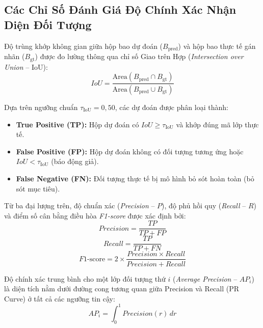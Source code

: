 \documentclass[12pt,a4paper]{article}
\begin{document}
\subsection{Các Chỉ Số Đánh Giá Độ Chính Xác Nhận Diện Đối Tượng}
Độ trùng khớp không gian giữa hộp bao dự đoán ($B_{\text{pred}}$) và hộp bao thực tế gán nhãn ($B_{\text{gt}}$) được đo lường thông qua chỉ số Giao trên Hợp (\textit{Intersection over Union} -- IoU):
\begin{equation}
\label{eq:iou_metric}
IoU = \frac{\text{Area}(B_{\text{pred}} \cap B_{\text{gt}})}{\text{Area}(B_{\text{pred}} \cup B_{\text{gt}})}
\end{equation}

Dựa trên ngưỡng chuẩn $\tau_{\text{IoU}} = 0,50$, các dự đoán được phân loại thành:
\begin{itemize}
    \item \textbf{True Positive (TP):} Hộp dự đoán có $IoU \ge \tau_{\text{IoU}}$ và khớp đúng mã lớp thực tế.
    \item \textbf{False Positive (FP):} Hộp dự đoán không có đối tượng tương ứng hoặc $IoU < \tau_{\text{IoU}}$ (báo động giả).
    \item \textbf{False Negative (FN):} Đối tượng thực tế bị mô hình bỏ sót hoàn toàn (bỏ sót mục tiêu).
\end{itemize}

Từ ba đại lượng trên, độ chuẩn xác (\textit{Precision} -- $P$), độ phủ hồi quy (\textit{Recall} -- $R$) và điểm số cân bằng điều hòa \textit{F1-score} được xác định bởi:
\begin{equation}
\label{eq:precision_metric}
Precision = \frac{TP}{TP + FP}
\end{equation}
\begin{equation}
\label{eq:recall_metric}
Recall = \frac{TP}{TP + FN}
\end{equation}
\begin{equation}
\label{eq:f1_metric}
F1\text{-score} = 2 \times \frac{Precision \times Recall}{Precision + Recall}
\end{equation}

Độ chính xác trung bình cho một lớp đối tượng thứ $i$ (\textit{Average Precision} -- $AP_i$) là diện tích nằm dưới đường cong tương quan giữa Precision và Recall (PR Curve) ở tất cả các ngưỡng tin cậy:
\begin{equation}
\label{eq:ap_metric}
AP_i = \int_0^1 Precision(r) \, dr
\end{equation}
\end{document}

